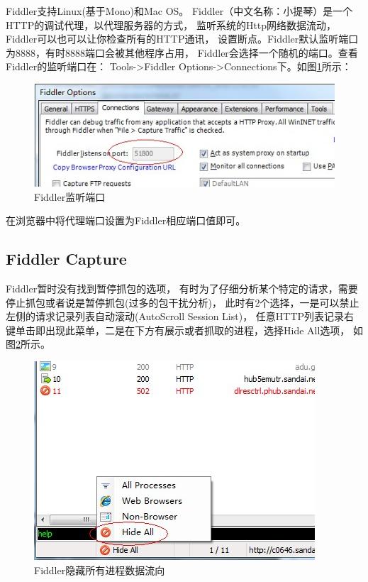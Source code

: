 \documentclass{book}
\begin{document}
Fiddler支持Linux(基于Mono)和Mac OS。
Fiddler（中文名称：小提琴）是一个HTTP的调试代理，以代理服务器的方式，
监听系统的Http网络数据流动，Fiddler可以也可以让你检查所有的HTTP通讯，
设置断点。Fiddler默认监听端口为8888，有时8888端口会被其他程序占用，
Fiddler会选择一个随机的端口。查看Fiddler的监听端口在：
Tools->Fiddler Options->Connections下。如图\ref{fig:FiddlerListeningPort}所示：

\begin{figure}[htbp]
	\centering
	\includegraphics[scale=0.8]{FiddlerListeningPort.jpg}
	\caption{Fiddler监听端口}
	\label{fig:FiddlerListeningPort}
\end{figure}

在浏览器中将代理端口设置为Fiddler相应端口值即可。

\subsection{Fiddler Capture}

Fiddler暂时没有找到暂停抓包的选项，
有时为了仔细分析某个特定的请求，需要停止抓包或者说是暂停抓包(过多的包干扰分析)，
此时有2个选择，一是可以禁止左侧的请求记录列表自动滚动(AutoScroll Session List)，
任意HTTP列表记录右键单击即出现此菜单，二是在下方有展示或者抓取的进程，选择Hide All选项，
如图\ref{fig:HideAllProcessCapture}所示。

\begin{figure}[htbp]
	\centering
	\includegraphics[scale=0.5]{HideAllProcessCapture.jpg}
	\caption{Fiddler隐藏所有进程数据流向}
	\label{fig:HideAllProcessCapture}
\end{figure}
\end{document}
